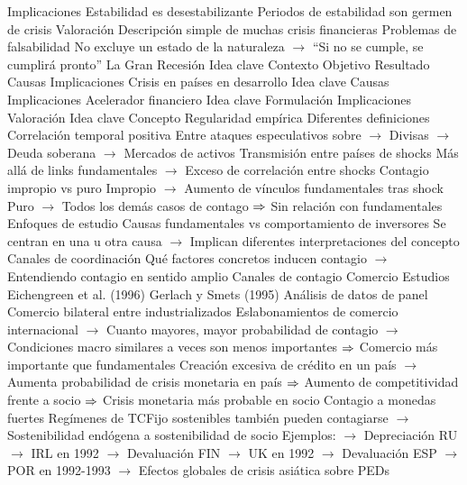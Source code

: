 \documentclass{nuevotema}
\begin{document}
\begin{esquemal}
			\3 Implicaciones
				\4 Estabilidad es desestabilizante
				\4[] Periodos de estabilidad son germen de crisis
			\3 Valoración
				\4 Descripción simple de muchas crisis financieras
				\4 Problemas de falsabilidad
				\4[] No excluye un estado de la naturaleza
				\4[] $\to$ ``Si no se cumple, se cumplirá pronto''
		\2 La Gran Recesión
			\3 Idea clave
				\4 Contexto
				\4 Objetivo
				\4 Resultado
			\3 Causas
			\3 Implicaciones
		\2 Crisis en países en desarrollo
			\3 Idea clave
			\3 Causas
			\3 Implicaciones
		\2 Acelerador financiero
			\3 Idea clave
			\3 Formulación
			\3 Implicaciones
			\3 Valoración
	\1 
		\2 Idea clave
			\3 Concepto
				\4 Regularidad empírica
				\4 Diferentes definiciones
				\4 Correlación temporal positiva
				\4[] Entre ataques especulativos sobre
				\4[] $\to$ Divisas
				\4[] $\to$ Deuda soberana
				\4[] $\to$ Mercados de activos
				\4 Transmisión entre países de shocks
				\4[] Más allá de links fundamentales
				\4[] $\to$ Exceso de correlación entre shocks
				\4 Contagio impropio vs puro
				\4[] Impropio
				\4[] $\to$ Aumento de vínculos fundamentales tras shock
				\4[] Puro
				\4[] $\to$ Todos los demás casos de contago
				\4[] $\Rightarrow$ Sin relación con fundamentales
			\3 Enfoques de estudio
				\4 Causas fundamentales vs comportamiento de inversores
				\4[] Se centran en una u otra causa
				\4[] $\to$ Implican diferentes interpretaciones del concepto
				\4 Canales de coordinación
				\4[] Qué factores concretos inducen contagio
				\4[] $\to$ Entendiendo contagio en sentido amplio
		\2 Canales de contagio
			\3 Comercio
				\4 Estudios
				\4[] Eichengreen et al. (1996)
				\4[] Gerlach y Smets (1995)
				\4 Análisis de datos de panel
				\4[] Comercio bilateral entre industrializados
				\4 Eslabonamientos de comercio internacional
				\4[] $\to$ Cuanto mayores, mayor probabilidad de contagio
				\4[] $\to$ Condiciones macro similares a veces son menos importantes
				\4[] $\Rightarrow$ Comercio más importante que fundamentales
				\4 Creación excesiva de crédito en un país
				\4[] $\to$ Aumenta probabilidad de crisis monetaria en país
				\4[] $\Rightarrow$ Aumento de competitividad frente a socio
				\4[] $\Rightarrow$ Crisis monetaria más probable en socio
				\4 Contagio a monedas fuertes
				\4[] Regímenes de TCFijo sostenibles también pueden contagiarse
				\4[] $\to$ Sostenibilidad endógena a sostenibilidad de socio
				\4[] Ejemplos:
				\4[] $\to$ Depreciación RU $\to$ IRL en 1992
				\4[] $\to$ Devaluación FIN $\to$ UK en 1992
				\4[] $\to$ Devaluación ESP $\to$ POR en 1992-1993
				\4[] $\to$ Efectos globales de crisis asiática sobre PEDs

\end{esquemal}
\end{document}

